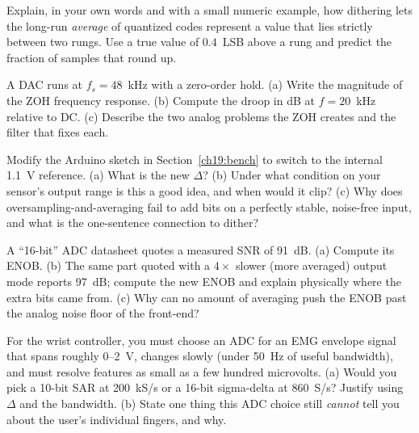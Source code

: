 \begin{exercise}
Explain, in your own words and with a small numeric example, how dithering lets the long-run
\emph{average} of quantized codes represent a value that lies strictly between two rungs. Use a
true value of $0.4$~LSB above a rung and predict the fraction of samples that round up.
\end{exercise}

\begin{exercise}
A DAC runs at $f_s = 48$~kHz with a zero-order hold. (a) Write the magnitude of the ZOH frequency
response. (b) Compute the droop in dB at $f = 20$~kHz relative to DC. (c) Describe the two analog
problems the ZOH creates and the filter that fixes each.
\end{exercise}

\begin{exercise}
Modify the Arduino sketch in Section~\ref{ch19:bench} to switch to the internal 1.1~V reference.
(a) What is the new $\Delta$? (b) Under what condition on your sensor's output range is this a good
idea, and when would it clip? (c) Why does oversampling-and-averaging fail to add bits on a
perfectly stable, noise-free input, and what is the one-sentence connection to dither?
\end{exercise}

\begin{exercise}
A ``16-bit'' ADC datasheet quotes a measured SNR of 91~dB. (a) Compute its ENOB. (b) The same part
quoted with a $4\times$ slower (more averaged) output mode reports 97~dB; compute the new ENOB and
explain physically where the extra bits came from. (c) Why can no amount of averaging push the
ENOB past the analog noise floor of the front-end?
\end{exercise}

\begin{exercise}
For the wrist controller, you must choose an ADC for an EMG envelope signal that spans roughly
0--2~V, changes slowly (under 50~Hz of useful bandwidth), and must resolve features as small as a
few hundred microvolts. (a) Would you pick a 10-bit SAR at 200~kS/s or a 16-bit sigma-delta at
860~S/s? Justify using $\Delta$ and the bandwidth. (b) State one thing this ADC choice still
\emph{cannot} tell you about the user's individual fingers, and why.
\end{exercise}
